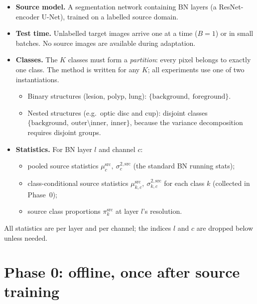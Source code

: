 \documentclass[11pt,a4paper]{article}
\newcommand{\src}{\mathrm{src}}
\begin{document}
\begin{itemize}
\item \textbf{Source model.} A segmentation network containing BN layers (a ResNet-encoder U-Net), trained on a labelled source domain.
\item \textbf{Test time.} Unlabelled target images arrive one at a time ($B=1$) or in small batches. No source images are available during adaptation.
\item \textbf{Classes.} The $K$ classes must form a \emph{partition}: every pixel belongs to exactly one class. The method is written for any $K$; all experiments use one of two instantiations.
  \begin{itemize}
  \item Binary structures (lesion, polyp, lung): $\{\text{background},\ \text{foreground}\}$.
  \item Nested structures (e.g.\ optic disc and cup): disjoint classes $\{\text{background},\ \text{outer}\setminus\text{inner},\ \text{inner}\}$, because the variance decomposition requires disjoint groups.
  \end{itemize}
\item \textbf{Statistics.} For BN layer $l$ and channel $c$:
  \begin{itemize}
  \item pooled source statistics $\mu^{\src}_c,\ \sigma^{2,\src}_c$ (the standard BN running stats);
  \item class-conditional source statistics $\mu^{\src}_{k,c},\ \sigma^{2,\src}_{k,c}$ for each class $k$ (collected in Phase~0);
  \item source class proportions $\pi^{\src}_k$ at layer $l$'s resolution.
  \end{itemize}
\end{itemize}
All statistics are per layer and per channel; the indices $l$ and $c$ are dropped below unless needed.

\section{Phase 0: offline, once after source training}
\end{document}
